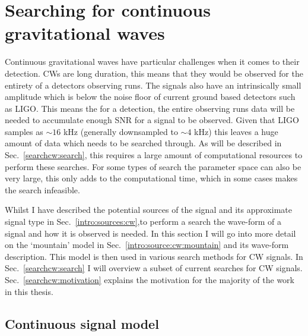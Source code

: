 \chapter{\label{searchcw}Searching for continuous gravitational waves}

Continuous gravitational waves have particular challenges when it comes to their detection.
\glspl{CW} are long duration, this means that they would be observed for the entirety of a detectors observing runs. 
The signals also have an intrinsically small amplitude which is below the noise floor of current ground based detectors such as \gls{LIGO}.
This means the for a detection, the entire observing runs data will be needed to accumulate enough \gls{SNR} for a signal to be observed.
Given that \gls{LIGO} samples as $\sim 16$ kHz (generally downsampled to $\sim 4$ kHz) this leaves a huge amount of data which needs to be searched through.
As will be described in Sec.~\ref{searchcw:search}, this requires a large amount of computational resources to perform these searches.
For some types of search the parameter space can also be very large, this only adds to the computational time, which in some cases makes the search infeasible.

Whilst I have described the potential sources of the signal and its approximate signal type in Sec.~\ref{intro:sources:cw},to perform a search the wave-form of a signal and how it is observed is needed.
In this section I will go into more detail on the `mountain' model in Sec.~\ref{intro:source:cw:mountain} and its wave-form description. 
This model is then used in various search methods for \gls{CW} signals.
In Sec.~\ref{searchcw:search} I will overview a subset of current searches for \gls{CW} signals.
Sec.~\ref{searchcw:motivation} explains the motivation for the majority of the work in this thesis.

\section{\label{searchcw:model}Continuous signal model}

